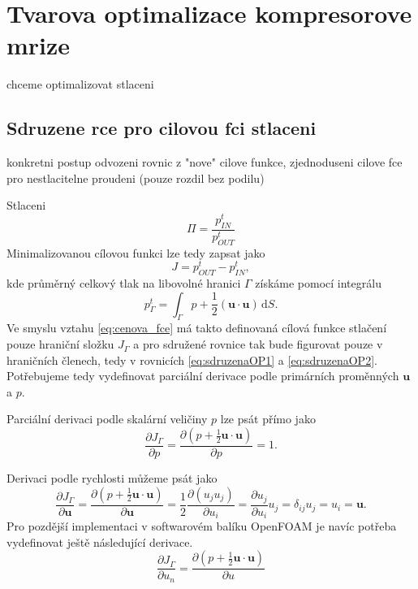 

\chapter{Tvarova optimalizace kompresorove mrize}

chceme optimalizovat stlaceni

\section{Sdruzene rce pro cilovou fci stlaceni}
konkretni postup odvozeni rovnic z "nove" cilove funkce, zjednoduseni cilove fce pro nestlacitelne proudeni (pouze rozdil bez podilu)

Stlaceni
\begin{equation}\label{key}
	\Pi = \dfrac{p_{IN}^{t}}{p_{OUT}^{t}}
\end{equation}
Minimalizovanou cílovou funkci lze tedy zapsat jako
\begin{equation}\label{key}
	J = p_{OUT}^{t}- p_{IN}^{t},
\end{equation}
kde průměrný celkový tlak na libovolné hranici $ \Gamma $ získáme pomocí integrálu
\begin{equation}\label{key}
	p^t_\Gamma = \int_\Gamma p+\dfrac{1}{2}(\mathbf{u}\cdot \mathbf{u}) \, \mathrm{d}S.
\end{equation}
Ve smyslu vztahu \ref{eq:cenova_fce} má takto definovaná cílová funkce stlačení pouze hraniční složku $ J_\Gamma $ a pro sdružené rovnice tak bude figurovat pouze v hraničních členech, tedy v rovnicích \ref{eq:sdruzenaOP1} a \ref{eq:sdruzenaOP2}. Potřebujeme tedy vydefinovat parciální derivace podle primárních proměnných $ \mathbf{u} $ a $ p $.

Parciální derivaci podle skalární veličiny $p$ lze psát přímo jako
\begin{equation}\label{key}
\dfrac{\partial J_\Gamma}{\partial p}
=
\dfrac
{\partial 
	\left( 
		p + \frac{1}{2} \mathbf{u}\cdot\mathbf{u} 
	\right)}
{\partial p}
= 1.
\end{equation}

Derivaci podle rychlosti můžeme psát jako
\begin{equation}\label{key}
\dfrac{\partial J_\Gamma}{\partial \mathbf{u}}
=
\dfrac{\partial \left( p + \frac{1}{2} \mathbf{u}\cdot\mathbf{u} \right)}{\partial \mathbf{u}}
=
\frac{1}{2}\dfrac{\partial \left( u_j u_j \right)}{\partial u_i} = \dfrac{\partial  u_j  }{\partial u_i}u_j = \delta_{ij}u_j=u_i=\mathbf{u}.
\end{equation}
Pro pozdější implementaci v softwarovém balíku OpenFOAM je navíc potřeba vydefinovat ještě následující derivace.
\begin{equation}\label{key}
\frac{\partial J_\Gamma}{\partial u_n} = 
\dfrac{\partial \left( p + \frac{1}{2} \mathbf{u}\cdot\mathbf{u} \right)}{\partial u}
\end{equation}

